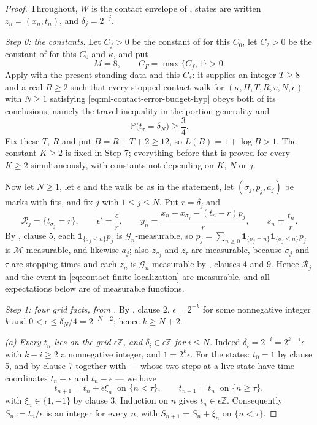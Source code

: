 \begin{proof}
Throughout, $W$ is the contact envelope of , states are
written $z_n=(x_n,t_n)$, and $\delta_j=2^{-j}$.

\emph{Step 0: the constants.}
Let $C_f>0$ be the constant of  for this $C_0$, let
$C_2>0$ be the constant of  for this $C_0$ and
$\kappa$, and put
\[
  M=8,\qquad C_\Gamma=\max\{C_f,1\}>0 .
\]
Apply  with the present standing data and this
$C_*$: it supplies an integer $T\ge8$ and a real $R\ge2$ such that every
stopped contact walk for $(\kappa,H,T,R,v,N,\epsilon)$ with $N\ge1$ satisfying
\eqref{eq:ml-contact-error-budget-hyp} obeys both of its conclusions, namely the
travel inequality in the portion generality and
\begin{equation}\label{eq:ml-hit}
  \mathbb P\bigl(t_\tau=\delta_N\bigr)\ge\frac34 .
\end{equation}
Fix these $T$, $R$ and put $B=R+T+2\ge12$, so $L(B)=1+\log B>1$. The constant
$K\ge2$ is fixed in Step 7; everything before that is proved for every
$K\ge2$ simultaneously, with constants not depending on $K$, $N$ or $j$.

Now let $N\ge1$, let $\epsilon$ and the walk be as in the statement, let
$(\sigma_j,p_j,a_j)$ be marks with fits, and fix $j$ with $1\le j\le N$. Put
$r=\delta_j$ and
\[
  \mathcal R_j=\{t_{\sigma_j}=r\},\qquad
  \epsilon'=\frac{\epsilon}{r},\qquad
  y_n=\frac{x_n-x_{\sigma_j}-(t_n-r)p_j}{r},\qquad
  s_n=\frac{t_n}{r}.
\]
By , clause 5, each $\mathbf1_{\{\sigma_j\le n\}}p_j$ is
$\mathcal G_n$-measurable, so $p_j=\sum_{n\ge0}\mathbf1_{\{\sigma_j=n\}}
 \mathbf1_{\{\sigma_j\le n\}}p_j$ is $\mathcal M$-measurable, and likewise
$a_j$; also $z_{\sigma_j}$ and $z_\tau$ are measurable, because $\sigma_j$ and
$\tau$ are stopping times and each $z_n$ is $\mathcal G_n$-measurable by
, clauses 4 and 9. Hence $\mathcal R_j$ and the event in
\eqref{eq:contact-finite-localization} are measurable, and all expectations
below are of measurable functions.

\emph{Step 1: four grid facts, from .}
By , clause 2, $\epsilon=2^{-k}$ for some nonnegative
integer $k$ and $0<\epsilon\le\delta_N/4=2^{-N-2}$; hence $k\ge N+2$.

\emph{(a) Every $t_n$ lies on the grid $\epsilon\mathbb Z$, and
$\delta_i\in\epsilon\mathbb Z$ for $i\le N$.} Indeed
$\delta_i=2^{-i}=2^{k-i}\epsilon$ with $k-i\ge2$ a nonnegative integer, and
$1=2^k\epsilon$. For the states: $t_0=1$ by clause 5, and by clause 7 together
with  --- whose two steps at a live state have time
coordinates $t_n+\epsilon$ and $t_n-\epsilon$ --- we have
\begin{equation}\label{eq:ml-timestep}
  t_{n+1}=t_n+\epsilon\xi_n\ \text{ on }\{n<\tau\},\qquad
  t_{n+1}=t_n\ \text{ on }\{n\ge\tau\},
\end{equation}
with $\xi_n\in\{1,-1\}$ by clause 3. Induction on $n$ gives
$t_n\in\epsilon\mathbb Z$. Consequently $S_n:=t_n/\epsilon$ is an integer for
every $n$, with $S_{n+1}=S_n+\xi_n$ on $\{n<\tau\}$.


\end{proof}
